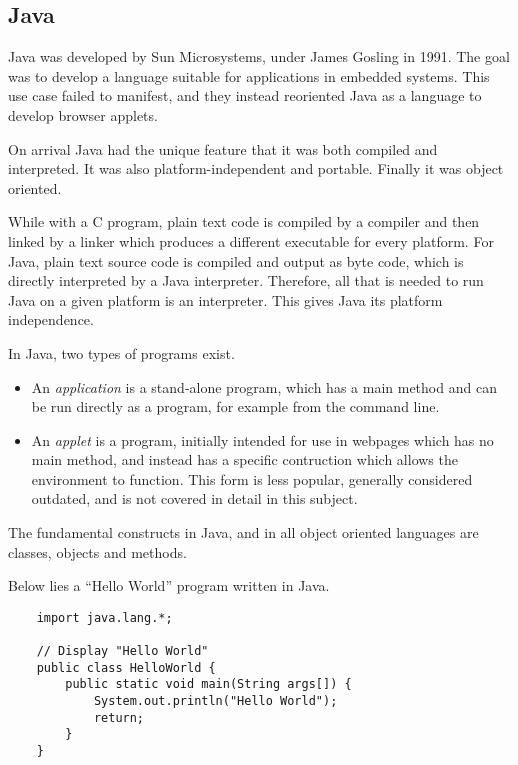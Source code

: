 \documentclass[12pt]{report}
\begin{document}
\begin{flushleft}
\section*{Java}    

Java was developed by Sun Microsystems, under James Gosling in 1991.
The goal was to develop a language suitable for applications in embedded 
systems. This use case failed to manifest, and they instead reoriented
Java as a language to develop browser applets.

\bigskip
On arrival Java had the unique feature that it was both compiled and
interpreted. It was also platform-independent and portable. Finally it was
object oriented.

\bigskip
While with a C program, plain text code is compiled by a compiler and then
linked by a linker which produces a different executable for every platform.
For Java, plain text source code is compiled and output as byte code, which
is directly interpreted by a Java interpreter. Therefore, all that is needed
to run Java on a given platform is an interpreter. This gives Java its 
platform independence.

\bigskip
In Java, two types of programs exist.
\begin{itemize}
    \item An \textit{application} is a stand-alone program, which has a main 
        method and can be run directly as a program, for example from the 
        command line.
    \item An \textit{applet} is a program, initially intended for use in 
        webpages which has no main method, and instead has a specific 
        contruction which allows the environment to function. This form is
        less popular, generally considered outdated, and is not covered in
        detail in this subject. 
\end{itemize}

\bigskip
The fundamental constructs in Java, and in all object oriented languages
are classes, objects and methods.

\bigskip
Below lies a ``Hello World'' program written in Java.


\begin{lstlisting}
    import java.lang.*;

    // Display "Hello World"
    public class HelloWorld {
        public static void main(String args[]) {
            System.out.println("Hello World");
            return;
        }
    }
\end{lstlisting}


\end{flushleft}
\end{document}
